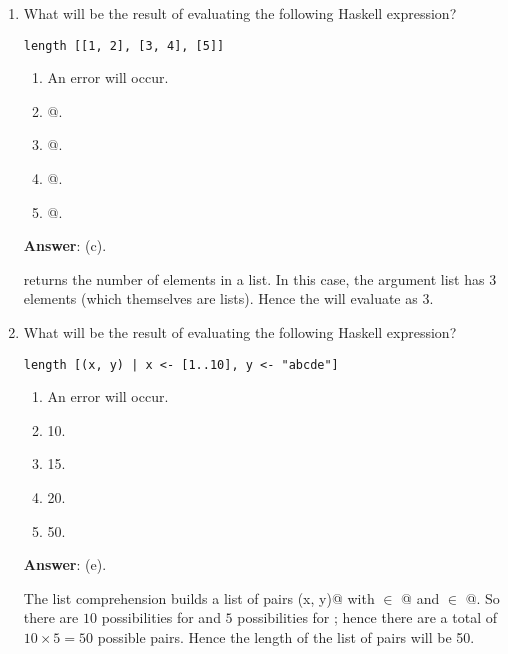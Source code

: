 \documentclass[12pt]{article}
\begin{document}
\begin{enumerate}

\item What will be the result of evaluating the following Haskell expression?

\begin{verbatim}
length [[1, 2], [3, 4], [5]]
\end{verbatim}

\begin{enumerate}

\item An error will occur.
\item {}@.  
\item {}@.  
\item {}@.  
\item {}@.  
  
\end{enumerate}

\textbf{Answer}: (c).

\verb@length@ returns the number of elements in a list.  In this case,
the argument list has 3 elements (which themselves are lists).  Hence
the \verb@length@ will evaluate as 3.

\item What will be the result of evaluating the following Haskell expression?

\begin{verbatim}
length [(x, y) | x <- [1..10], y <- "abcde"]  
\end{verbatim}

\begin{enumerate}

\item An error will occur.

\item 10.

\item 15.

\item 20.

\item 50.  

\end{enumerate}

\textbf{Answer}: (e).

The list comprehension builds a list of pairs \verb@(x, y)@ with
\verb@x@ $\in$ \verb@[1, 2, 3, ..., 10]@ and \verb@y@ $\in$
\verb@['a', 'b', 'c', 'd', 'e']@.  So there are $10$ possibilities for
\verb@x@ and $5$ possibilities for \verb@y@; hence there are a
total of $10\times 5 = 50$ possible pairs.  Hence the length of
the list of pairs will be 50.


\end{enumerate}
\end{document}
